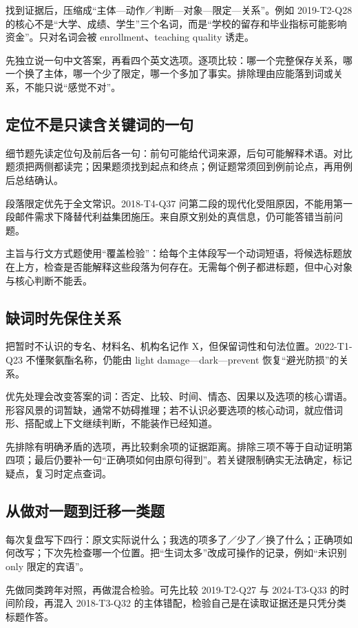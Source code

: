 \documentclass[11pt,a4paper]{article}
\begin{document}
找到证据后，压缩成“主体—动作／判断—对象—限定—关系”。例如 2019-T2-Q28 的核心不是“大学、成绩、学生”三个名词，而是“学校的留存和毕业指标可能影响资金”。只对名词会被 enrollment、teaching quality 诱走。

先独立说一句中文答案，再看四个英文选项。逐项比较：哪一个完整保存关系，哪一个换了主体，哪一个少了限定，哪一个多加了事实。排除理由应能落到词或关系，不能只说“感觉不对”。

\subsection{定位不是只读含关键词的一句}
细节题先读定位句及前后各一句：前句可能给代词来源，后句可能解释术语。对比题须把两侧都读完；因果题须找到起点和终点；例证题常须回到例前论点，再用例后总结确认。

段落限定优先于全文常识。2018-T4-Q37 问第二段的现代化受阻原因，不能用第一段邮件需求下降替代利益集团施压。来自原文别处的真信息，仍可能答错当前问题。

主旨与行文方式题使用“覆盖检验”：给每个主体段写一个动词短语，将候选标题放在上方，检查是否能解释这些段落为何存在。无需每个例子都进标题，但中心对象与核心判断不能丢。

\subsection{缺词时先保住关系}
把暂时不认识的专名、材料名、机构名记作 X，但保留词性和句法位置。2022-T1-Q23 不懂聚氨酯名称，仍能由 light damage—dark—prevent 恢复“避光防损”的关系。

优先处理会改变答案的词：否定、比较、时间、情态、因果以及选项的核心谓语。形容风景的词暂缺，通常不妨碍推理；若不认识必要选项的核心动词，就应借词形、搭配或上下文继续判断，不能装作已经知道。

先排除有明确矛盾的选项，再比较剩余项的证据距离。排除三项不等于自动证明第四项；最后仍要补一句“正确项如何由原句得到”。若关键限制确实无法确定，标记疑点，复习时定点查词。

\subsection{从做对一题到迁移一类题}
每次复盘写下四行：原文实际说什么；我选的项多了／少了／换了什么；正确项如何改写；下次先检查哪一个位置。把“生词太多”改成可操作的记录，例如“未识别 only 限定的宾语”。

先做同类跨年对照，再做混合检验。可先比较 2019-T2-Q27 与 2024-T3-Q33 的时间阶段，再混入 2018-T3-Q32 的主体错配，检验自己是在读取证据还是只凭分类标题作答。
\end{document}
